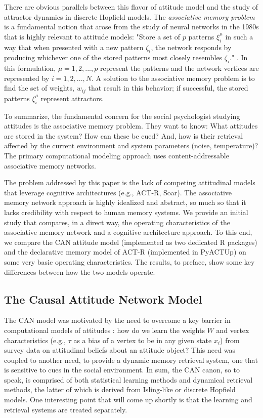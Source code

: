\documentclass[10pt,letterpaper]{article}
\begin{document}
There are obvious parallels between this flavor of attitude model and the study of attractor dynamics in discrete Hopfield models.  The \textit{associative memory problem} is a fundamental notion that arose from the study of neural networks in the 1980s that is highly relevant to attitude models: "Store a set of $p$ patterns $\xi^{\mu}_i$ in such a way that when presented with a new pattern $\zeta_i$, the network responds by producing whichever one of the stored patterns most closely resembles $\zeta_i$." \citep[][p. 11, paragraph 1]{HertzKroghPalmer1991}. In this formulation, $\mu = 1, 2, ..., p$ represent the patterns and the network vertices are represented by $i=1, 2, ..., N$. A solution to the associative memory problem is to find the set of weights, $w_{ij}$ that result in this behavior; if successful, the stored patterns $\xi^{\mu}_i$ represent attractors.

To summarize, the fundamental concern for the social psychologist studying attitudes is the associative memory problem. They want to know:  What attitudes are stored in the system? How can these be cued? And, how is their retrieval affected by the current environment and system parameters (noise, temperature)? The primary computational modeling approach uses content-addressable associative memory networks.

The problem addressed by this paper is the lack of competing attitudinal models that leverage cognitive architectures (e.g., ACT-R, Soar).  The associative memory network approach is highly idealized and abstract, so much so that it lacks credibility with respect to human memory systems.  We provide an initial study that compares, in a direct way, the operating characteristics of the associative memory network and a cognitive architecture approach.   To this end, we compare the CAN attitude model (implemented as two dedicated R packages) and the declarative memory model of ACT-R (implemented in PyACTUp) on some very basic operating characteristics. The results, to preface, show some key differences between how the two models operate.

\subsection{The Causal Attitude Network Model}
The CAN model was motivated by the need to overcome a key barrier in computational models of attitudes \citep{dalege2016}: how do we learn the weights $W$ and vertex characteristics (e.g., $\tau$ as a bias of a vertex to be in any given state $x_i$) from survey data on attitudinal beliefs about an attitude object? This need was coupled to another need, to provide a dynamic memory retrieval system, one that is sensitive to cues in the social environment.  In sum, the CAN canon, so to speak, is comprised of both statistical learning methods and dynamical retrieval methods, the latter of which is derived from Isling-like or discrete Hopfield models. One interesting point that will come up shortly is that the learning and retrieval systems are treated separately. 
\end{document}
